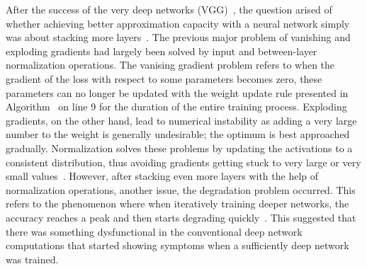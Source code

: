\documentclass[english,twoside,openright]{UH_DS_MSc}
\begin{document}
After the success of the very deep networks (VGG)~\cite{vgg}, the question arised of whether 
achieving better approximation capacity with a neural network simply was about stacking more layers~\cite{resnet}.
The previous major problem of vanishing and exploding gradients had largely been solved by input and between-layer 
normalization operations. The vanising gradient problem refers to when the gradient of the loss with respect to 
some parameters becomes zero, these parameters can no longer be updated with the weight update rule presented in 
Algorithm~\cite{alg:net_training} on line 9 for the duration of the entire training process. Exploding 
gradients, on the other hand, lead to numerical instability as adding a very large number to the weight is 
generally undesirable; the optimum is best approached gradually. Normalization solves these problems by 
updating the activations to a consistent distribution, thus avoiding gradients getting stuck to very large or very small values~\cite{batchnorm}.
However, after stacking even more layers with the help of normalization operations, another issue, the degradation 
problem occurred. This refers to the phenomenon where when iteratively training deeper networks, the accuracy 
reaches a peak and then starts degrading quickly~\cite{resnet}. This suggested that there was something dysfunctional in 
the conventional deep network computations that started showing symptoms when a sufficiently deep network was trained.
\end{document}
